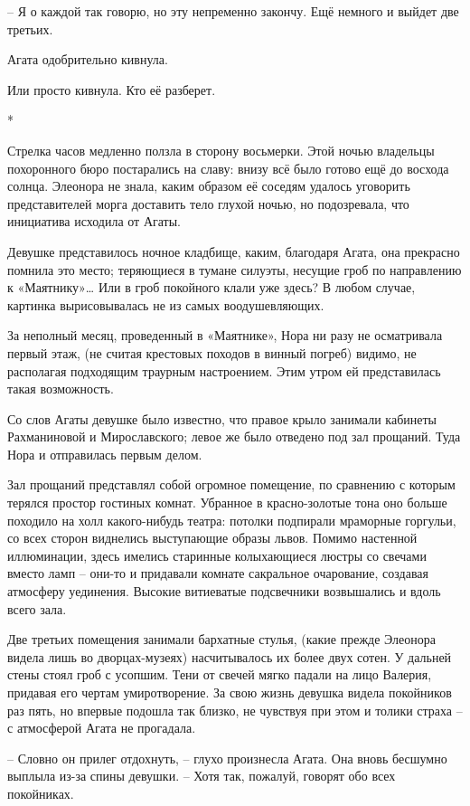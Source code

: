 \documentclass[
  a5paperpaper,
  DIV=11,
  numbers=noendperiod]{scrreprt}
\begin{document}
-- Я о каждой так говорю, но эту непременно закончу. Ещё немного и
выйдет две третьих.

Агата одобрительно кивнула.

Или просто кивнула. Кто её разберет.

*

Стрелка часов медленно ползла в сторону восьмерки. Этой ночью владельцы
похоронного бюро постарались на славу: внизу всё было готово ещё до
восхода солнца. Элеонора не знала, каким образом её соседям удалось
уговорить представителей морга доставить тело глухой ночью, но
подозревала, что инициатива исходила от Агаты.

Девушке представилось ночное кладбище, каким, благодаря Агата, она
прекрасно помнила это место; теряющиеся в тумане силуэты, несущие гроб
по направлению к «Маятнику»\ldots{} Или в гроб покойного клали уже
здесь? В любом случае, картинка вырисовывалась не из самых
воодушевляющих.

За неполный месяц, проведенный в «Маятнике», Нора ни разу не осматривала
первый этаж, (не считая крестовых походов в винный погреб) видимо, не
располагая подходящим траурным настроением. Этим утром ей представилась
такая возможность.

Со слов Агаты девушке было известно, что правое крыло занимали кабинеты
Рахманиновой и Мирославского; левое же было отведено под зал прощаний.
Туда Нора и отправилась первым делом.

Зал прощаний представлял собой огромное помещение, по сравнению с
которым терялся простор гостиных комнат. Убранное в красно-золотые тона
оно больше походило на холл какого-нибудь театра: потолки подпирали
мраморные горгульи, со всех сторон виднелись выступающие образы львов.
Помимо настенной иллюминации, здесь имелись старинные колыхающиеся
люстры со свечами вместо ламп -- они-то и придавали комнате сакральное
очарование, создавая атмосферу уединения. Высокие витиеватые подсвечники
возвышались и вдоль всего зала.

Две третьих помещения занимали бархатные стулья, (какие прежде Элеонора
видела лишь во дворцах-музеях) насчитывалось их более двух сотен. У
дальней стены стоял гроб с усопшим. Тени от свечей мягко падали на лицо
Валерия, придавая его чертам умиротворение. За свою жизнь девушка видела
покойников раз пять, но впервые подошла так близко, не чувствуя при этом
и толики страха -- с атмосферой Агата не прогадала.

-- Словно он прилег отдохнуть, -- глухо произнесла Агата. Она вновь
бесшумно выплыла из-за спины девушки. -- Хотя так, пожалуй, говорят обо
всех покойниках.
\end{document}
